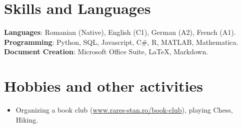 \documentclass[a4paper, 11pt]{article}
\begin{document}
\section{Skills and Languages}
 \begin{itemize}[leftmargin=0.5cm, label={}]
    {\item{
     \textbf{Languages}{: Romanian (Native), English (C1), German (A2), French (A1).} \\
     \textbf{Programming}{: Python, SQL, Javascript, C\#, R, MATLAB, Mathematica.} \\
     \textbf{Document Creation}{: Microsoft Office Suite, LaTeX, Markdown.} \\
    }}
 \end{itemize}
 

\section{Hobbies and other activities}
\begin{itemize}[leftmargin=0.5cm, label={}]
\item{
Organizing a book club (\href{https://www.rares-stan.ro/book-club}{www.rares-stan.ro/book-club}), playing Chess, Hiking.}
\end{itemize}
 
    
\end{document}
